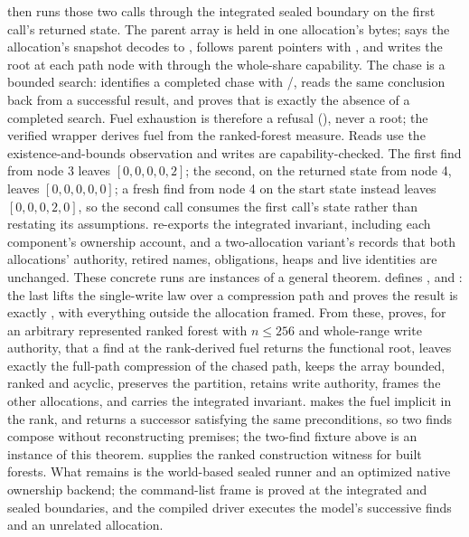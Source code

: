 \documentclass[a4paper,UKenglish,cleveref]{lipics-v2021}
\begin{document}
 then runs those two calls through the integrated
sealed boundary on the first call's returned state. The parent array is held in
one allocation's bytes;  says the allocation's snapshot decodes
to ,  follows parent pointers with , and
 writes the root at each path node with 
through the whole-share capability. The chase is a bounded search:
 identifies a completed chase with
/,  reads the same
conclusion back from a successful result, and  proves that
 is exactly the absence of a completed search. Fuel exhaustion is
therefore a refusal (), never a root; the
verified wrapper  derives fuel  from the
ranked-forest measure. Reads use the existence-and-bounds observation
 and writes are capability-checked. The first find from node 3 leaves $[0,0,0,0,2]$; the second, on the
returned state from node 4, leaves $[0,0,0,0,0]$; a fresh find from node 4 on the
start state instead leaves $[0,0,0,2,0]$, so the second call consumes the first
call's state rather than restating its assumptions. 
re-exports the integrated invariant, including each component's ownership
account, and a two-allocation variant's 
records that both allocations' authority, retired names, obligations, heaps and
live identities are unchanged. These concrete runs are instances of a general
theorem.  defines ,  and
: the last lifts the single-write law over a compression
path and proves the result is exactly , with everything outside
the allocation framed. From these,  proves, for an
arbitrary represented ranked forest with $n\leq256$ and whole-range write
authority, that a find at the rank-derived fuel returns the functional root,
leaves exactly the full-path compression of the chased path, keeps the array
bounded, ranked and acyclic, preserves the partition, retains write authority,
frames the other allocations, and carries the integrated invariant.
 makes the fuel implicit in the rank, and
 returns a successor satisfying the same preconditions, so
two finds compose without reconstructing premises; the two-find fixture above is
an instance of this theorem.  supplies the ranked
construction witness for built forests. What remains is the world-based sealed
runner and an optimized native ownership backend; the command-list frame is
proved at the integrated and sealed boundaries, and the compiled 
driver executes the model's successive finds and an unrelated allocation.
\end{document}
